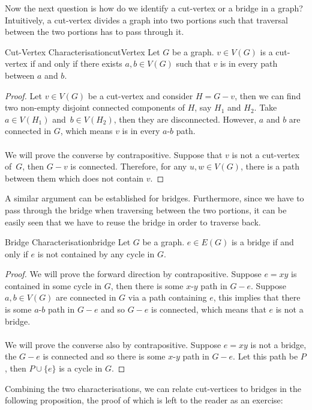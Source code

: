 \documentclass[math]{amznotes}
\theoremstyle{remark}
\newcommand{\0}{\mathbf{0}}
\newcommand{\1}{\mathbf{1}}
\begin{document}
Now the next question is how do we identify a cut-vertex or a bridge in a graph? Intuitively, a cut-vertex divides a graph into two portions such that traversal between the two portions has to pass through it.
\begin{thmbox}{Cut-Vertex Characterisation}{cutVertex}
    Let $G$ be a graph. $v \in V(G)$ is a cut-vertex if and only if there exists $a, b \in V(G)$ such that $v$ is in every path between $a$ and $b$.
    \tcblower
    \begin{proof}
        Let $v \in V(G)$ be a cut-vertex and consider $H = G - v$, then we can find two non-empty disjoint connected components of $H$, say $H_1$ and $H_2$. Take $a \in V(H_1)$ and~$b \in V(H_2)$, then they are disconnected. However, $a$ and $b$ are connected in $G$, which means $v$ is in every $a$-$b$ path.
        \\\\
        We will prove the converse by contrapositive. Suppose that $v$ is not a cut-vertex of~$G$, then $G - v$ is connected. Therefore, for any $u, w \in V(G)$, there is a path between them which does not contain $v$.
    \end{proof}
\end{thmbox}
A similar argument can be established for bridges. Furthermore, since we have to pass through the bridge when traversing between the two portions, it can be easily seen that we have to reuse the bridge in order to traverse back.
\begin{thmbox}{Bridge Characterisation}{bridge}
    Let $G$ be a graph. $e \in E(G)$ is a bridge if and only if $e$ is not contained by any cycle in $G$.
    \tcblower
    \begin{proof}
        We will prove the forward direction by contrapositive. Suppose $e = xy$ is contained in some cycle in $G$, then there is some $x$-$y$ path in $G - e$. Suppose $a, b \in V(G)$ are connected in $G$ via a path containing $e$, this implies that there is some $a$-$b$ path in $G - e$ and so $G - e$ is connected, which means that $e$ is not a bridge.
        \\\\
        We will prove the converse also by contrapositive. Suppose $e = xy$ is not a bridge, the $G - e$ is connected and so there is some $x$-$y$ path in $G - e$. Let this path be $P$, then $P \cup \{e\}$ is a cycle in $G$.
    \end{proof}
\end{thmbox}
Combining the two characterisations, we can relate cut-vertices to bridges in the following proposition, the proof of which is left to the reader as an exercise:
\end{document}
